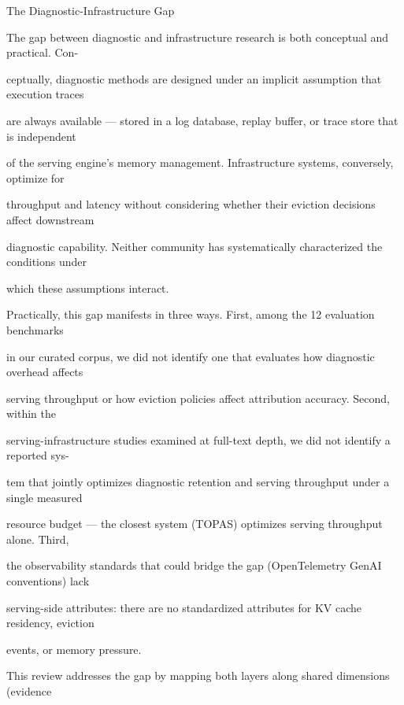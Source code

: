 \begin{flushleft}
\par\smallskip
\par\smallskip
\par\smallskip
{} The Diagnostic-Infrastructure Gap\par
\noindent The gap between diagnostic and infrastructure research is both conceptual and practical. Con-\par
\noindent ceptually, diagnostic methods are designed under an implicit assumption that execution traces\par
\noindent are always available — stored in a log database, replay buffer, or trace store that is independent\par
\noindent of the serving engine’s memory management. Infrastructure systems, conversely, optimize for\par
\noindent throughput and latency without considering whether their eviction decisions affect downstream\par
\noindent diagnostic capability. Neither community has systematically characterized the conditions under\par
\noindent which these assumptions interact.\par
\noindent  Practically, this gap manifests in three ways. First, among the 12 evaluation benchmarks\par
\noindent in our curated corpus, we did not identify one that evaluates how diagnostic overhead affects\par
\noindent serving throughput or how eviction policies affect attribution accuracy. Second, within the\par
\noindent serving-infrastructure studies examined at full-text depth, we did not identify a reported sys-\par
\noindent tem that jointly optimizes diagnostic retention and serving throughput under a single measured\par
\noindent resource budget — the closest system (TOPAS) optimizes serving throughput alone. Third,\par
\noindent the observability standards that could bridge the gap (OpenTelemetry GenAI conventions) lack\par
\noindent serving-side attributes: there are no standardized attributes for KV cache residency, eviction\par
\noindent events, or memory pressure.\par
\noindent  This review addresses the gap by mapping both layers along shared dimensions (evidence\par

\end{flushleft}
